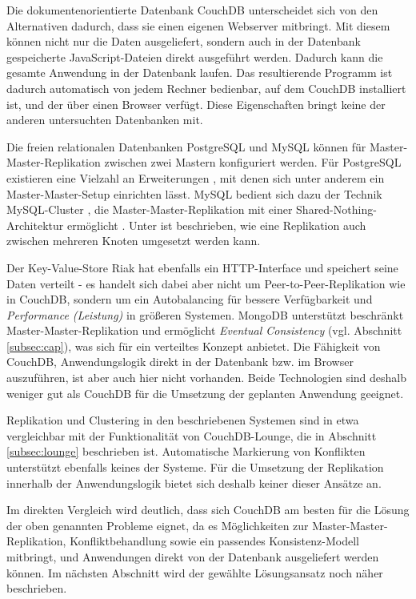 Die dokumentenorientierte Datenbank CouchDB unterscheidet sich von den Alternativen dadurch, dass sie einen eigenen Webserver mitbringt. Mit diesem können nicht nur die Daten ausgeliefert, sondern auch in der Datenbank gespeicherte JavaScript-Dateien direkt ausgeführt werden. Dadurch kann die gesamte Anwendung in der Datenbank laufen. Das resultierende Programm ist dadurch automatisch von jedem Rechner bedienbar, auf dem CouchDB installiert ist, und der über einen Browser verfügt. Diese Eigenschaften bringt keine der anderen untersuchten Datenbanken mit.

Die freien relationalen Datenbanken PostgreSQL \cite{postgres:website} und MySQL \cite{mysql:website} können für Master-Master-Replikation zwischen zwei Mastern konfiguriert werden. Für PostgreSQL existieren eine Vielzahl an Erweiterungen \cite{postgres:replication}, mit denen sich unter anderem ein Master-Master-Setup einrichten lässt. MySQL bedient sich dazu der Technik MySQL-Cluster \cite{mysql:cluster}, die Master-Master-Replikation mit einer Shared-Nothing-Architektur ermöglicht . Unter \cite{mysql:multimaster} ist beschrieben, wie eine Replikation auch zwischen mehreren Knoten umgesetzt werden kann. 

Der Key-Value-Store Riak \cite{riak:website} hat ebenfalls ein HTTP-Interface und speichert seine Daten verteilt - es handelt sich dabei aber nicht um Peer-to-Peer-Replikation wie in CouchDB, sondern um ein Autobalancing für bessere Verfügbarkeit und \textit{Performance (Leistung)} in größeren Systemen. MongoDB \cite{mongodb:website} unterstützt beschränkt Master-Master-Replikation und ermöglicht \textit{Eventual Consistency} (vgl. Abschnitt \ref{subsec:cap}), was sich für ein verteiltes Konzept anbietet. Die Fähigkeit von CouchDB, Anwendungslogik direkt in der Datenbank bzw. im Browser auszuführen, ist aber auch hier nicht vorhanden. Beide Technologien sind deshalb weniger gut als CouchDB für die Umsetzung der geplanten Anwendung geeignet. 

Replikation und Clustering in den beschriebenen Systemen sind in etwa vergleichbar mit der Funktionalität von CouchDB-Lounge, die in Abschnitt \ref{subsec:lounge} beschrieben ist. Automatische Markierung von Konflikten unterstützt ebenfalls keines der Systeme. Für die Umsetzung der Replikation innerhalb der Anwendungslogik bietet sich deshalb keiner dieser Ansätze an.

Im direkten Vergleich wird deutlich, dass sich CouchDB am besten für die Lösung der oben genannten Probleme eignet, da es Möglichkeiten zur Master-Master-Replikation, Konfliktbehandlung sowie ein passendes Konsistenz-Modell mitbringt, und Anwendungen direkt von der Datenbank ausgeliefert werden können. Im nächsten Abschnitt wird der gewählte Lösungsansatz noch näher beschrieben.



